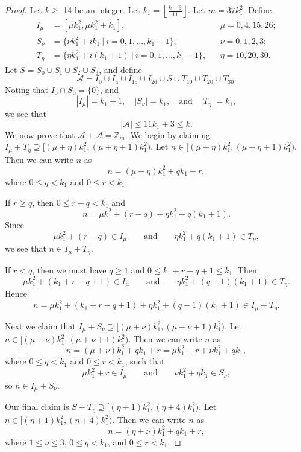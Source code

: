 \documentclass[11pt]{article}
\theoremstyle{definition}
\def\Z{\mbox{$\mathbb Z$}}
\begin{document}
\begin{proof}
Let $k \geq$ 14 be an integer. Let $\displaystyle k_1 = \left \lfloor \frac{k - 3}{11} \right \rfloor$. Let $m = 37k_1^2$.  Define 
\begin{align*}
I_\mu &= [\mu k_1^2, \mu k_1^2 + k_1],
&&\mu = 0, 4, 15, 26; \\
S_\nu &= \{\nu k_1^2 + ik_1 \ |\  i = 0 , 1, ... , k_1 - 1\},
&&\nu = 0, 1, 2, 3;\\
T_{\eta} &= \{\eta k_1^2+ i(k_1 + 1) \ |\   i = 0 , 1, ... , k_1 -1\},
&&\eta = 10, 20, 30.
\end{align*}
 Let $S= S_{0} \cup S_{1} \cup S_{2} \cup S_{3}$, and
define
\[
\mathcal{A}=I_0\cup I_4\cup I_{15}\cup I_{26}\cup S\cup T_{10}\cup T_{20}\cup T_{30}.
\]
Noting  that $I_0\cap S_0=\{0\}$, and 
\[
|I_\mu| = k_1 + 1,\quad 
|S_\nu| = k_1,\quad\text{and}\quad
|T_\eta| = k_1,
\]
we see that 
\[
|\mathcal{A|} \leq 11k_1 + 3 \leq k.
\]  
We now prove that $\mathcal{A}+\mathcal{A}=\Z_m$.
We begin by claiming $I_{\mu}+T_{\eta}\supseteq[(\mu + \eta )k_1^2 ,  (\mu + \eta  + 1)k_1^2)$. Let $n \in[(\mu + \eta )k_1^2 ,  (\mu + \eta  + 1)k_1^2)$.
Then we can write $n$ as 
\[
n = (\mu + \eta ) k_1^2 + qk_1 + r,
\]
where $0 \leq q < k_1$ and $0 \leq r < k_1$.

If $r \geq q$, then $0\le r-q<k_{1}$ and
\[
n = \mu k_1^2 +  (r - q)+ \eta k_1^2 + q(k_1+1).
\]
 Since 
 \[
 \mu k_1^2 + (r - q) \in I_\mu\qquad\text{and}\qquad \eta k_1^2 +q(k_1+1) \in T_\eta,
 \]
we see that $n \in I_{\mu}+T_{\eta}$. 

If $r < q$, then we must have $q \geq 1$ and $0\le k_{1}+r-q+1\le k_{1}$. Then
\[
\mu k_1^2 + (k_1 + r - q + 1) \in I_\mu \qquad \text{and}\qquad
\eta k_1^2 + (q - 1)(k_1 + 1) \in T_\eta.
\]
 Hence
\[
n = \mu k_1^2 + (k_1 + r - q + 1)+\eta k_1^2 + (q - 1)(k_1 + 1) \in I_{\mu}+T_{\eta}.
\]
 

Next we claim that  $I_{\mu}+S_{\nu}\supseteq[(\mu + \nu )k_1^2 ,  (\mu + \nu  + 1)k_1^2)$. Let $n \in[(\mu + \nu )k_1^2 ,  (\mu + \nu  + 1)k_1^2)$.
Then we can write $n$ as 
\[
n = (\mu + \nu ) k_1^2 + qk_1 + r = \mu k_1^2 + r+\nu k_1^2 + qk_1,
\]
where  $0 \leq q < k_1$ and $0 \leq r < k_1$, such that 
\[
\mu k_1^2 + r \in I_\mu \qquad\text{and}\qquad\nu k_1^2 + qk_1 \in S_\nu,
\]
 so $n \in I_{\mu}+S_{\nu}$. 

Our final claim is $S+T_\eta \supseteq[(\eta  +1)k_1^2 ,  (\eta  + 4)k_1^2)$.  Let $n \in[(\eta  +1)k_1^2 ,  (\eta  + 4)k_1^2)$.
Then we can write $n$ as 
\[
n = (\eta  + \nu ) k_1^2 + qk_1 + r, 
\]
where $1 \leq \nu  \leq 3$, $0 \leq q < k_1$, and $0 \leq r < k_1$. 


\end{proof}
\end{document}
